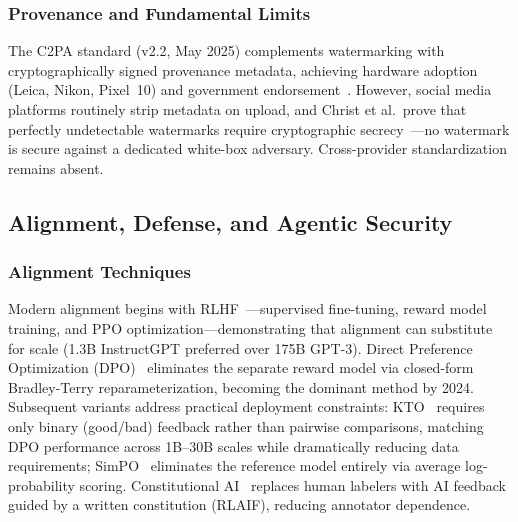 \subsubsection{Provenance and Fundamental Limits}
\label{sec:provenance}

The C2PA standard (v2.2, May 2025) complements watermarking with cryptographically signed provenance metadata, achieving hardware adoption (Leica, Nikon, Pixel~10) and government endorsement~\cite{c2pa2025}. However, social media platforms routinely strip metadata on upload, and Christ et al.\ prove that perfectly undetectable watermarks require cryptographic secrecy~\cite{christ2024undetectable}---no watermark is secure against a dedicated white-box adversary. Cross-provider standardization remains absent.




\subsection{Alignment, Defense, and Agentic Security}
\label{sec:alignment}

\subsubsection{Alignment Techniques}
\label{sec:alignment-tech}

Modern alignment begins with RLHF~\cite{ouyang2022rlhf}---supervised fine-tuning, reward model training, and PPO optimization---demonstrating that alignment can substitute for scale (1.3B InstructGPT preferred over 175B GPT-3). Direct Preference Optimization (DPO)~\cite{rafailov2023dpo} eliminates the separate reward model via closed-form Bradley-Terry reparameterization, becoming the dominant method by 2024. Subsequent variants address practical deployment constraints: KTO~\cite{ethayarajh2024kto} requires only binary (good/bad) feedback rather than pairwise comparisons, matching DPO performance across 1B--30B scales while dramatically reducing data requirements; SimPO~\cite{meng2024simpo} eliminates the reference model entirely via average log-probability scoring. Constitutional AI~\cite{bai2022constitutionalai} replaces human labelers with AI feedback guided by a written constitution (RLAIF), reducing annotator dependence.

